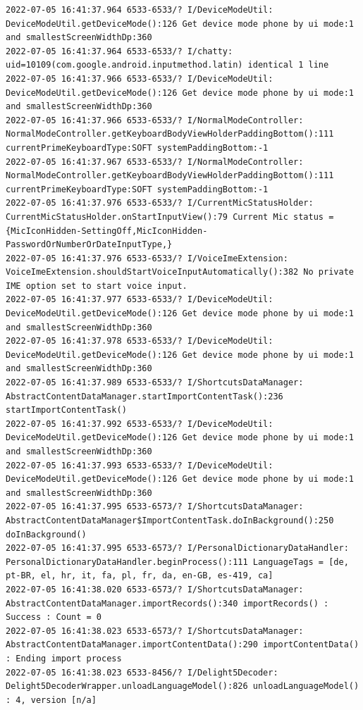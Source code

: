 \documentclass[a4paper,12pt]{book}
\begin{document}
\begin{lstlisting}
2022-07-05 16:41:37.964 6533-6533/? I/DeviceModeUtil: DeviceModeUtil.getDeviceMode():126 Get device mode phone by ui mode:1 and smallestScreenWidthDp:360
2022-07-05 16:41:37.964 6533-6533/? I/chatty: uid=10109(com.google.android.inputmethod.latin) identical 1 line
2022-07-05 16:41:37.966 6533-6533/? I/DeviceModeUtil: DeviceModeUtil.getDeviceMode():126 Get device mode phone by ui mode:1 and smallestScreenWidthDp:360
2022-07-05 16:41:37.966 6533-6533/? I/NormalModeController: NormalModeController.getKeyboardBodyViewHolderPaddingBottom():111 currentPrimeKeyboardType:SOFT systemPaddingBottom:-1
2022-07-05 16:41:37.967 6533-6533/? I/NormalModeController: NormalModeController.getKeyboardBodyViewHolderPaddingBottom():111 currentPrimeKeyboardType:SOFT systemPaddingBottom:-1
2022-07-05 16:41:37.976 6533-6533/? I/CurrentMicStatusHolder: CurrentMicStatusHolder.onStartInputView():79 Current Mic status = {MicIconHidden-SettingOff,MicIconHidden-PasswordOrNumberOrDateInputType,}
2022-07-05 16:41:37.976 6533-6533/? I/VoiceImeExtension: VoiceImeExtension.shouldStartVoiceInputAutomatically():382 No private IME option set to start voice input.
2022-07-05 16:41:37.977 6533-6533/? I/DeviceModeUtil: DeviceModeUtil.getDeviceMode():126 Get device mode phone by ui mode:1 and smallestScreenWidthDp:360
2022-07-05 16:41:37.978 6533-6533/? I/DeviceModeUtil: DeviceModeUtil.getDeviceMode():126 Get device mode phone by ui mode:1 and smallestScreenWidthDp:360
2022-07-05 16:41:37.989 6533-6533/? I/ShortcutsDataManager: AbstractContentDataManager.startImportContentTask():236 startImportContentTask()
2022-07-05 16:41:37.992 6533-6533/? I/DeviceModeUtil: DeviceModeUtil.getDeviceMode():126 Get device mode phone by ui mode:1 and smallestScreenWidthDp:360
2022-07-05 16:41:37.993 6533-6533/? I/DeviceModeUtil: DeviceModeUtil.getDeviceMode():126 Get device mode phone by ui mode:1 and smallestScreenWidthDp:360
2022-07-05 16:41:37.995 6533-6573/? I/ShortcutsDataManager: AbstractContentDataManager$ImportContentTask.doInBackground():250 doInBackground()
2022-07-05 16:41:37.995 6533-6573/? I/PersonalDictionaryDataHandler: PersonalDictionaryDataHandler.beginProcess():111 LanguageTags = [de, pt-BR, el, hr, it, fa, pl, fr, da, en-GB, es-419, ca]
2022-07-05 16:41:38.020 6533-6573/? I/ShortcutsDataManager: AbstractContentDataManager.importRecords():340 importRecords() : Success : Count = 0
2022-07-05 16:41:38.023 6533-6573/? I/ShortcutsDataManager: AbstractContentDataManager.importContentData():290 importContentData() : Ending import process
2022-07-05 16:41:38.023 6533-8456/? I/Delight5Decoder: Delight5DecoderWrapper.unloadLanguageModel():826 unloadLanguageModel() : 4, version [n/a]

\end{lstlisting}
\end{document}
